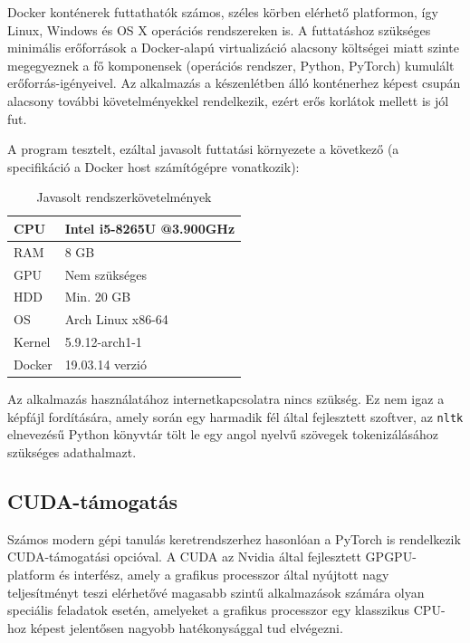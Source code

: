 \documentclass[twoside, 12pt]{report}
\begin{document}

Docker konténerek futtathatók számos, széles körben elérhető platformon, így Linux, Windows és OS X operációs rendszereken is. A futtatáshoz szükséges minimális erőforrások a Docker-alapú virtualizáció alacsony költségei miatt szinte megegyeznek a fő komponensek (operációs rendszer, Python, PyTorch) kumulált erőforrás-igényeivel. Az alkalmazás a készenlétben álló konténerhez képest csupán alacsony további követelményekkel rendelkezik, ezért erős korlátok mellett is jól fut.

A program tesztelt, ezáltal javasolt futtatási környezete a következő (a specifikáció a Docker host számítógépre vonatkozik):

\begin{table}[h]
  \centering
  \begin{tabular}{|l|l|}
    \hline
    CPU & Intel i5-8265U @3.900GHz \\ \hline
    RAM & 8 GB \\ \hline
    GPU & Nem szükséges \\ \hline
    HDD & Min. 20 GB \\ \hline
    OS & Arch Linux x86-64 \\ \hline
    Kernel & 5.9.12-arch1-1 \\ \hline
    Docker & 19.03.14 verzió \\
    \hline
  \end{tabular}
  \caption{Javasolt rendszerkövetelmények}
\end{table}

Az alkalmazás használatához internetkapcsolatra nincs szükség. Ez nem igaz a képfájl fordítására, amely során egy harmadik fél által fejlesztett szoftver, az \verb|nltk| \parencite{BKL09a} elnevezésű Python könyvtár tölt le egy angol nyelvű szövegek tokenizálásához szükséges adathalmazt.

\subsection{CUDA-támogatás}

Számos modern gépi tanulás keretrendszerhez hasonlóan a PyTorch is rendelkezik CUDA\footnotemark{}-támogatási opcióval. A CUDA az Nvidia által fejlesztett GPGPU-platform és interfész, amely a grafikus processzor által nyújtott nagy teljesítményt teszi elérhetővé magasabb szintű alkalmazások számára olyan speciális feladatok esetén, amelyeket a grafikus processzor egy klasszikus CPU-hoz képest jelentősen nagyobb hatékonysággal tud elvégezni.
\end{document}
